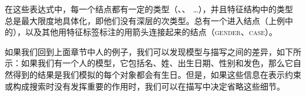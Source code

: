在这些表达式中，每一个结点都有一定的类型（、、 \ldots），并且特征结构中的类型总是最大限度地具体化，即他们没有深层的次类型。总有一个进入结点（上例中的），以及其他用特征标签标注的用箭头连接起来的结点（\textsc{gender}、\textsc{case}）。

如果我们回到上面章节中人的例子，我们可以发现模型与描写之间的差异，如下所示：如果我们有一个人的模型，它包括名、姓、出生日期、性别和发色，那么它自然得到的结果是我们模拟的每个对象都会有生日。但是，如果这些信息在表示约束或构成搜索时没有发挥重要的作用时，我们可以在描写中决定省略这些细节。

